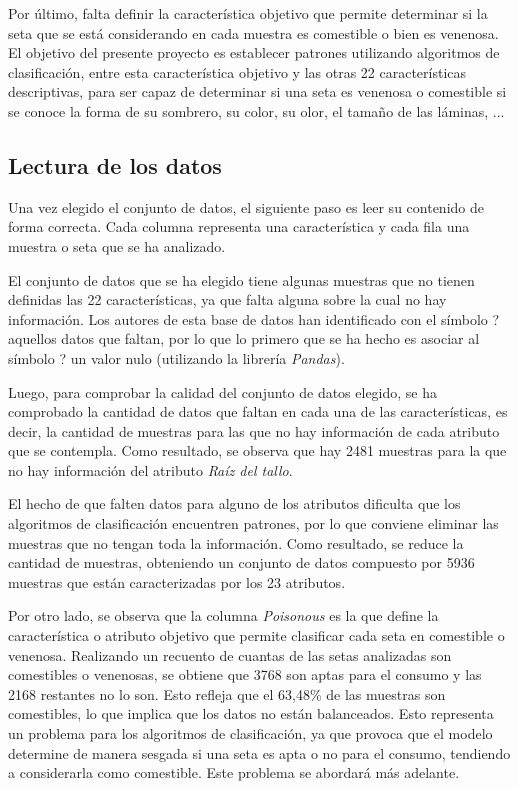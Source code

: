 \documentclass{Plantilla/Formato_EPEF}
\begin{document}
Por último, falta definir la característica objetivo que permite determinar si la seta que se está considerando en cada muestra es comestible o bien es venenosa. El objetivo del presente proyecto es establecer patrones utilizando algoritmos de clasificación, entre esta característica objetivo y las otras 22 características descriptivas, para ser capaz de determinar si una seta es venenosa o comestible si se conoce la forma de su sombrero, su color, su olor, el tamaño de las láminas, ...


	
\subsection{Lectura de los datos}
Una vez elegido el conjunto de datos, el siguiente paso es leer su contenido de forma correcta. Cada columna representa una característica y cada fila una muestra o seta que se ha analizado.


El conjunto de datos que se ha elegido tiene algunas muestras que no tienen definidas las 22 características, ya que falta alguna sobre la cual no hay información. Los autores de esta base de datos han identificado con el símbolo \textgravedbl?\textacutedbl aquellos datos que faltan, por lo que lo primero que se ha hecho es asociar al símbolo ? un valor nulo (utilizando la librería \textit{Pandas}).


Luego, para comprobar la calidad del conjunto de datos elegido, se ha comprobado la cantidad de datos que faltan en cada una de las características, es decir, la cantidad de muestras para las que no hay información de cada atributo que se contempla. Como resultado, se observa que hay 2481 muestras para la que no hay información del atributo \textit{Raíz del tallo}.

El hecho de que falten datos para alguno de los atributos dificulta que los algoritmos de clasificación encuentren patrones, por lo que conviene eliminar las muestras que no tengan toda la información. Como resultado, se reduce la cantidad de muestras, obteniendo un conjunto de datos compuesto por 5936 muestras que están caracterizadas por los 23 atributos.


Por otro lado, se observa que la columna \textit{Poisonous} es la que define la característica o atributo objetivo que permite clasificar cada seta en comestible o venenosa. Realizando un recuento de cuantas de las setas analizadas son comestibles o venenosas, se obtiene que 3768 son aptas para el consumo y las 2168 restantes no lo son. Esto refleja que el 63,48\% de las muestras son comestibles, lo que implica que los datos no están balanceados. Esto representa un problema para los algoritmos de clasificación, ya que provoca que el modelo determine de manera sesgada si una seta es apta o no para el consumo, tendiendo a considerarla como comestible. Este problema se abordará más adelante.
\end{document}
